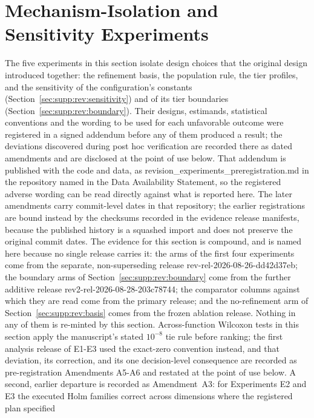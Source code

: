 \documentclass[algorithms,article,submit,moreauthors,pdftex]{Definitions/mdpi}
\begin{document}
\section{Mechanism-Isolation and Sensitivity Experiments}\label{sec:supp:revision}

\noindent The five experiments in this section isolate design choices that
the original design introduced together: the refinement basis, the
population rule, the tier profiles, and the sensitivity of the
configuration's constants (Section~\ref{sec:supp:rev:sensitivity}) and of
its tier boundaries (Section~\ref{sec:supp:rev:boundary}).
Their designs, estimands, statistical conventions and the wording to
be used for each unfavorable outcome were registered in a signed addendum
before any of them produced a result; the deviations discovered during
post hoc verification are recorded there as dated amendments and are
disclosed at the point of use below.  That addendum is published with the code
and data, as revision\_experiments\_preregistration.md in the repository
named in the Data Availability Statement, so the registered adverse wording
can be read directly against what is reported here.  The later amendments
carry commit-level dates in that repository; the earlier registrations are
bound instead by the checksums recorded in the evidence release manifests,
because the published history is a squashed import and does not preserve the
original commit dates.
The evidence for this section is compound, and is named here because no
single release carries it: the arms of the first four experiments come from
the separate, non-superseding release rev-rel-2026-08-26-dd42d37eb; the boundary arms of
Section~\ref{sec:supp:rev:boundary} come from the further additive release
rev2-rel-2026-08-28-203c78744; the comparator columns
against which they are read come from the primary release; and the
no-refinement arm of Section~\ref{sec:supp:rev:basis} comes from the frozen
ablation release.  Nothing in any of them is re-minted by this section.
Across-function Wilcoxon tests in this section apply the manuscript's stated
$10^{-8}$ tie rule before ranking; the first analysis release of E1-E3 used
the exact-zero convention instead, and that deviation, its correction, and its
one decision-level consequence are recorded as pre-registration Amendments
A5-A6 and restated at the point of use below.  A second, earlier departure
is recorded as Amendment~A3: for Experiments E2 and E3 the executed Holm
families correct across dimensions where the registered plan specified
\end{document}
